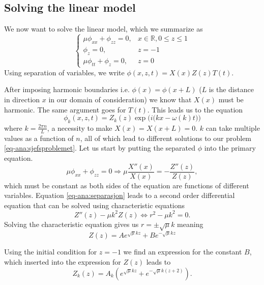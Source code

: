 \documentclass[11pt]{article}
\begin{document}
\subsection{Solving the linear model}
We now want to solve the linear model, which we summarize as
\begin{equation}
\begin{cases}
\label{eq-ana:sjefsproblemet}
\mu \phi _{xx} + \phi_{zz} = 0, &  x \in \mathbb{R}, 0 \leq z \leq 1 \\
\phi _z = 0,    & z = -1 \\
\mu \phi_{tt} + \phi_z = 0, & z = 0
\end{cases}
\end{equation}
Using separation of variables, we write $\phi(x,z,t) = X(x)Z(z)T(t)$.

After imposing harmonic boundaries i.e. $\phi(x) = \phi(x+L)$ ($L$ is the distance in direction $x$ in our domain of consideration) we know that $X(x)$ must be harmonic. The same argument goes for $T(t)$. This leads us to the equation
\begin{equation*}
\phi_k (x,z,t) = Z_k(z) \exp \Big( i \big( kx - \omega(k)t \big) \Big)
\end{equation*}
where $k=\frac{2 \pi n}{L}$, a necessity to make $X(x) = X(x+L) = 0$. $k$ can take multiple values as a function of $n$, all of which lead to different solutions to our problem \eqref{eq-ana:sjefsproblemet}. Let us start by putting the separated $\phi$ into the primary equation.
\begin{equation}
\mu \phi_{xx} + \phi_{zz} = 0 \Longrightarrow \mu \frac{X '' (x)}{X(x)} = -\frac{Z '' (z)}{Z(z)},
\label{eq-ana:separasjon}
\end{equation}
which must be constant as both sides of the equation are functions of different variables. Equation \eqref{eq-ana:separasjon}
leads to a second order differential equation that can be solved using characteristic equations
\begin{equation*}
Z''(z) - \mu k^2 Z(z) \Longleftrightarrow r^2 - \mu k^2 = 0.
\end{equation*}
Solving the characteristic equation gives us $r = \pm \sqrt{\mu}k$ meaning
\begin{equation*}
Z(z) = A e^{\sqrt{\mu}k z} + Be^{-\sqrt{\mu}k z}
\end{equation*}

Using the initial condition for $z = -1$ we find an expression for the constant $B$, which inserted into the expression for $Z(z)$ leads to
\begin{equation*}
Z_k(z) = A_k \left( e^{\sqrt{\mu}kz} + e^{-\sqrt{\mu}k(z+2) } \right).
\end{equation*}
\end{document}
